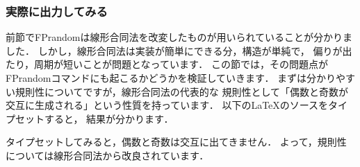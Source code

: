 \subsubsection{実際に出力してみる}
前節でFPrandomは線形合同法を改変したものが用いられていることが分かりました．
しかし，線形合同法は実装が簡単にできる分，構造が単純で，
偏りが出たり，周期が短いことが問題となっています．
この節では，その問題点がFPrandomコマンドにも起こるかどうかを検証していきます．
まずは分かりやすい規則性についてですが，線形合同法の代表的な
規則性として「偶数と奇数が交互に生成される」という性質を持っています．
以下の\LaTeX のソースをタイプセットすると，
結果が分かります．
タイプセットしてみると，偶数と奇数は交互に出てきません．
よって，規則性については線形合同法から改良されています．

